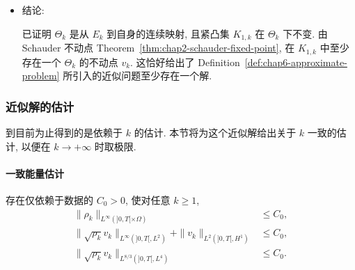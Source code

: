 \begin{sloppypar}
\begin{itemize}
 借助上面得到的收敛性, 可以在 $v_k^n$ 所满足的方程中令 $n\to\infty$. 最终得到 $\rho_k,v_k,w_k$ 满足\eqref{eq:chap6-conservative-approximate-momentum}; 再加上两倍的\eqref{eq:chap6-transport-product-identity}, 得 $v_k$ 满足\eqref{eq:chap6-integrated-linearized-momentum}, 因而在 $\mathcal D'(]0,T[)$ 意义下满足微分方程\eqref{eq:chap6-linearized-approximate-momentum}. 一旦 $\rho_k,w_k$ 固定, \eqref{eq:chap6-linearized-approximate-momentum}的解唯一 (且等于 $\Theta_k(w_k)$), 因而用 Proposition~\ref{prop:chap2-unique-subsequence-limit} 证明中相同的论证, 推出整个序列 $(v_k^n)_n$, 而不只是一个子列, 实际上在 $C^0([0,T],(H^1(\Omega))^d)$ 中收敛于 $v_k=\Theta_k(w_k)$. 这就完成了映射 $\Theta_k$ 连续性的证明.

 \item 结论:

 已证明 $\Theta_k$ 是从 $E_k$ 到自身的连续映射, 且紧凸集 $K_{1,k}$ 在 $\Theta_k$ 下不变. 由 Schauder 不动点 Theorem~\ref{thm:chap2-schauder-fixed-point}, 在 $K_{1,k}$ 中至少存在一个 $\Theta_k$ 的不动点 $v_k$. 这恰好给出了 Definition~\ref{def:chap6-approximate-problem} 所引入的近似问题至少存在一个解.
\end{itemize}

\subsubsection{近似解的估计}
\label{subsec:chap6-approximate-estimates}

到目前为止得到的是依赖于 $k$ 的估计. 本节将为这个近似解给出关于 $k$ 一致的估计, 以便在 $k\to+\infty$ 时取极限.

\paragraph{一致能量估计}
\label{subsec:chap6-uniform-energy-estimates}

\begin{Lemma}
\label{lem:chap6-uniform-energy-estimates}
存在仅依赖于数据的 $C_0>0$, 使对任意 $k\geq1$,
\begin{align}
 \|\rho_k\|_{L^\infty(]0,T[\times\Omega)}&\leq C_0,
\label{eq:chap6-uniform-density-bound}\\
 \|\sqrt{\rho_k}v_k\|_{L^\infty(]0,T[,L^2)}
 +\|v_k\|_{L^2(]0,T[,H^1)}&\leq C_0,
\label{eq:chap6-uniform-energy-bound}\\
 \|\sqrt{\rho_k}v_k\|_{L^{8/3}(]0,T[,L^4)}&\leq C_0.
\label{eq:chap6-uniform-interpolation-bound}
\end{align}
\end{Lemma}


\end{sloppypar}
